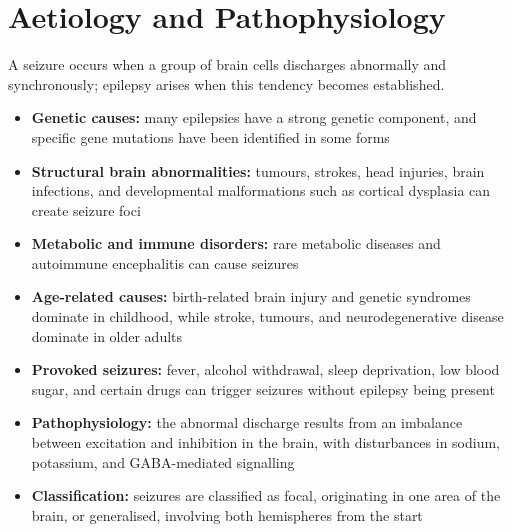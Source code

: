 \section*{Aetiology and Pathophysiology}
A seizure occurs when a group of brain cells discharges abnormally and synchronously; epilepsy arises when this tendency becomes established.
\begin{itemize}
    \item \textbf{Genetic causes:} many epilepsies have a strong genetic component, and specific gene mutations have been identified in some forms
    \item \textbf{Structural brain abnormalities:} tumours, strokes, head injuries, brain infections, and developmental malformations such as cortical dysplasia can create seizure foci
    \item \textbf{Metabolic and immune disorders:} rare metabolic diseases and autoimmune encephalitis can cause seizures
    \item \textbf{Age-related causes:} birth-related brain injury and genetic syndromes dominate in childhood, while stroke, tumours, and neurodegenerative disease dominate in older adults
    \item \textbf{Provoked seizures:} fever, alcohol withdrawal, sleep deprivation, low blood sugar, and certain drugs can trigger seizures without epilepsy being present
    \item \textbf{Pathophysiology:} the abnormal discharge results from an imbalance between excitation and inhibition in the brain, with disturbances in sodium, potassium, and GABA-mediated signalling
    \item \textbf{Classification:} seizures are classified as focal, originating in one area of the brain, or generalised, involving both hemispheres from the start
\end{itemize}

